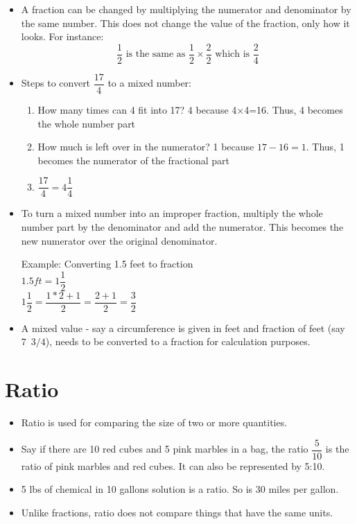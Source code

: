 \begin{itemize}
\item A fraction can be changed by multiplying the numerator and denominator by the same number. This does not change the value of the fraction, only how it looks. For instance:
$$
\dfrac{1}{2} \text { is the same as } \dfrac{1}{2} \times \dfrac{2}{2} \text { which is } \dfrac{2}{4}
$$

\item Steps to convert $\dfrac{17}{4}$ to a mixed number:
\begin{enumerate}[Step 1.]
\item How many times can 4 fit into 17? 4 because 4×4=16.  Thus, 4 becomes the whole number part
\item How much is left over in the numerator? 1 because $17-16=1$.  Thus, 1 becomes the numerator of the fractional part
\item $\dfrac{17}{4} = 4\dfrac{1}{4}$
\end{enumerate}
\vspace{0.2cm}
\item To turn a mixed number into an improper fraction, multiply the whole number part by the denominator and add the numerator. This becomes the new numerator over the original denominator.

Example: Converting 1.5 feet to fraction\\
$1.5ft=1\dfrac{1}{2}$\\
\vspace{0.2cm}
$1\dfrac{1}{2}=\dfrac{1*2+1}{2}=\dfrac{2+1}{2}=\dfrac{3}{2}$
\vspace{0.2cm}
\item A mixed value - say a circumference is given in feet and fraction of feet (say $7 \enspace 3/4$), needs to be converted to a fraction for calculation purposes.
\end{itemize}

\section{Ratio}
\begin{itemize}
\item Ratio is used for comparing the size of two or more quantities.
\item Say if there are 10 red cubes and 5 pink marbles in a bag, the ratio $\dfrac{5}{10}$ is the ratio of pink marbles and red cubes.  It can also be represented by 5:10.
\item 5 lbs of chemical in 10 gallons solution is a ratio.  So is 30 miles per gallon.
\item Unlike fractions, ratio does not compare things that have the same units.
\end{itemize}
